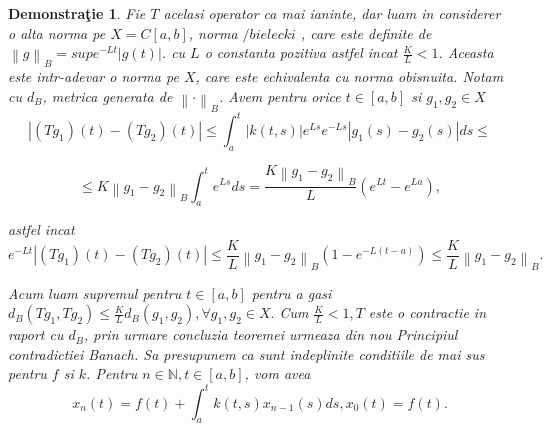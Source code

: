 \documentclass[a4paper,12pt,oneside]{report}
\newtheorem{demonstration}{Demonstra\c tie}
\begin{document}
\begin{demonstration}
					
	Fie \(T\) acelasi operator ca mai ianinte, dar luam in considerer o alta norma pe \(X = C\left [ a,b \right ]\), norma \(/bielecki\) , care este definite de \(\left \| g \right \|_{B} = sup e^{-Lt}\left | g\left ( t \right ) \right |\). 
	cu \(L\) o constanta pozitiva astfel incat \(\frac{K}{L} < 1\). Aceasta este intr-adevar o norma pe \(X\), care este echivalenta cu norma obisnuita. Notam cu \(d_{B}\), metrica generata de \(\left \| \cdot \right \|_{B}\). Avem pentru orice \(t\in \left [ a,b  \right ]\) si \(g_{1}, g_{2} \in X\) 
	\begin{displaymath}
		\left | \left ( Tg_{1} \right )\left ( t \right ) - \left ( Tg_{2} \right )\left ( t \right ) \right | \leq  \int_{a}^{t} \left | k\left ( t,s \right ) \right |e^{Ls}e^{-Ls}\left | g_{1}\left ( s \right ) - g_{2}\left ( s \right ) \right |ds \leq
	\end{displaymath}
					
	\begin{displaymath}
		\leq K\left \| g_{1} - g_{2} \right \|_{B} \int_{a}^{t}e^{Ls}ds = \frac{K \left \| g_{1} - g_{2} \right \|_{B}}{L}\left ( e^{Lt} - e^{La}\right ),
	\end{displaymath}
					
					 
	astfel incat 
	\begin{displaymath}
		e^{-Lt}\left | \left ( Tg_{1} \right ) \left ( t \right ) - \left ( Tg_{2} \right )\left ( t \right )\right |\leq \frac{K}{L}\left \| g_{1} - g_{2}\right \|_{B}\left ( 1 - e^{-L\left ( t-a \right )} \right ) \leq  \frac{K}{L}\left \| g_{1}  - g_{2}\right \|_{B}. 
	\end{displaymath}
					
	Acum luam supremul pentru \(t \in \left [ a,b \right ]\) pentru a gasi
	\(d_{B}\left ( Tg_{1}, Tg_{2} \right ) \leq \frac{K}{L}d_{B}\left ( g_{1} , g_{2}\right ), \forall g_{1}, g_{2}\in X. \)
	Cum \(\frac{K}{L} < 1, T\) este o contractie in raport cu \(d_{B}\), prin urmare concluzia teoremei urmeaza din nou Principiul contradictiei Banach. 
	Sa presupunem ca sunt indeplinite conditiile de mai sus pentru \(f\) si \(k\). Pentru \(n\in \mathbb{N}, t\in \left [ a,b \right ]\), vom avea
	\begin{displaymath}
		x_{n}\left ( t \right ) = f\left ( t \right ) + \int_{a}^{t}k\left ( t,s \right )x_{n-1}\left ( s \right )ds,
		x_{0}\left ( t \right ) = f\left ( t \right ).
	\end{displaymath}
					 

\end{demonstration}
\end{document}
